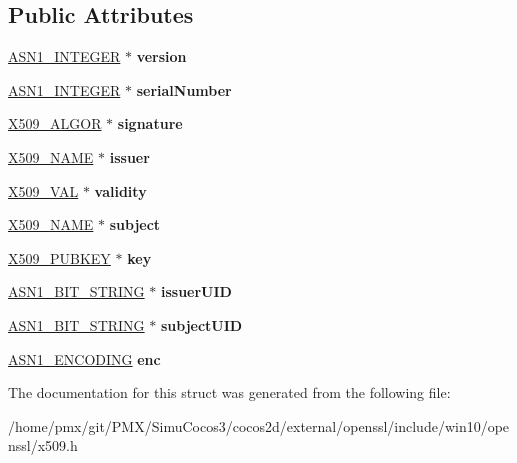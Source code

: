 \subsection*{Public Attributes}
\begin{DoxyCompactItemize}
\item 
\mbox{\label{structx509__cinf__st_a6376a52ce4df3f461bc4f16c27a38c64}} 
\hyperlink{structasn1__string__st}{A\+S\+N1\+\_\+\+I\+N\+T\+E\+G\+ER} $\ast$ {\bfseries version}
\item 
\mbox{\label{structx509__cinf__st_a53d185a4d78f4f99ec1d0de2915291e7}} 
\hyperlink{structasn1__string__st}{A\+S\+N1\+\_\+\+I\+N\+T\+E\+G\+ER} $\ast$ {\bfseries serial\+Number}
\item 
\mbox{\label{structx509__cinf__st_a09006fd313228489ac13ebe6730c6362}} 
\hyperlink{structX509__algor__st}{X509\+\_\+\+A\+L\+G\+OR} $\ast$ {\bfseries signature}
\item 
\mbox{\label{structx509__cinf__st_aa9afd91f729b8e9859c84f2b65a747a3}} 
\hyperlink{structX509__name__st}{X509\+\_\+\+N\+A\+ME} $\ast$ {\bfseries issuer}
\item 
\mbox{\label{structx509__cinf__st_ac808f4c20ecdf9bfae8656d205e8add1}} 
\hyperlink{structX509__val__st}{X509\+\_\+\+V\+AL} $\ast$ {\bfseries validity}
\item 
\mbox{\label{structx509__cinf__st_acb4d49364d293a9f6166ce759965ac54}} 
\hyperlink{structX509__name__st}{X509\+\_\+\+N\+A\+ME} $\ast$ {\bfseries subject}
\item 
\mbox{\label{structx509__cinf__st_ad4ae834b88db41b67f7c54193267cd34}} 
\hyperlink{structX509__pubkey__st}{X509\+\_\+\+P\+U\+B\+K\+EY} $\ast$ {\bfseries key}
\item 
\mbox{\label{structx509__cinf__st_a39d82c3b8a147a5e8ed99ee24a79f791}} 
\hyperlink{structasn1__string__st}{A\+S\+N1\+\_\+\+B\+I\+T\+\_\+\+S\+T\+R\+I\+NG} $\ast$ {\bfseries issuer\+U\+ID}
\item 
\mbox{\label{structx509__cinf__st_a5a8aba3df2b00582cee4b51ab9c9588a}} 
\hyperlink{structasn1__string__st}{A\+S\+N1\+\_\+\+B\+I\+T\+\_\+\+S\+T\+R\+I\+NG} $\ast$ {\bfseries subject\+U\+ID}
\item 
\mbox{\label{structx509__cinf__st_ad5373b5c6b59286b2c5c9166de0b5284}} 
\hyperlink{structASN1__ENCODING__st}{A\+S\+N1\+\_\+\+E\+N\+C\+O\+D\+I\+NG} {\bfseries enc}
\end{DoxyCompactItemize}


The documentation for this struct was generated from the following file\+:\begin{DoxyCompactItemize}
\item 
/home/pmx/git/\+P\+M\+X/\+Simu\+Cocos3/cocos2d/external/openssl/include/win10/openssl/x509.\+h\end{DoxyCompactItemize}
